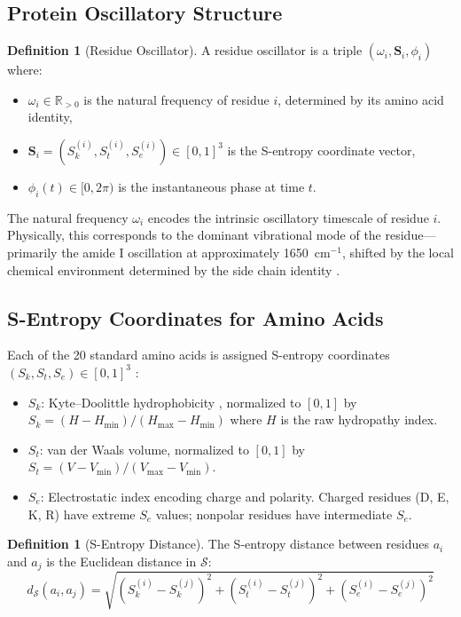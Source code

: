 \documentclass[11pt,twocolumn,a4paper]{article}
\theoremstyle{definition}
\newtheorem{definition}[theorem]{Definition}
\theoremstyle{remark}
\newcommand{\Sk}{S_k}
\newcommand{\St}{S_t}
\newcommand{\Se}{S_e}
\newcommand{\Sspace}{\mathcal{S}}
\newcommand{\Scoord}{\mathbf{S}}
\newcommand{\R}{\mathbb{R}}
\newcommand{\natfreq}{\omega}
\begin{document}
\subsection{Protein Oscillatory Structure}

\begin{definition}[Residue Oscillator]
\label{def:residue_oscillator}
A residue oscillator is a triple $(\natfreq_i, \Scoord_i, \phi_i)$ where:
\begin{itemize}
    \item $\natfreq_i \in \R_{>0}$ is the natural frequency of residue $i$, determined by its amino acid identity,
    \item $\Scoord_i = (\Sk^{(i)}, \St^{(i)}, \Se^{(i)}) \in [0,1]^3$ is the S-entropy coordinate vector,
    \item $\phi_i(t) \in [0, 2\pi)$ is the instantaneous phase at time $t$.
\end{itemize}
\end{definition}

The natural frequency $\natfreq_i$ encodes the intrinsic oscillatory timescale of residue $i$. Physically, this corresponds to the dominant vibrational mode of the residue---primarily the amide I oscillation at approximately 1650~cm$^{-1}$, shifted by the local chemical environment determined by the side chain identity \citep{barth2007, krimm1986}.

\subsection{S-Entropy Coordinates for Amino Acids}
\label{sec:s_entropy}

Each of the 20 standard amino acids is assigned S-entropy coordinates $(\Sk, \St, \Se) \in [0,1]^3$ \citep{sachikonye2025c}:
\begin{itemize}
    \item $\Sk$: Kyte--Doolittle hydrophobicity \citep{kyte1982}, normalized to $[0,1]$ by $\Sk = (H - H_{\min}) / (H_{\max} - H_{\min})$ where $H$ is the raw hydropathy index.
    \item $\St$: van der Waals volume, normalized to $[0,1]$ by $\St = (V - V_{\min}) / (V_{\max} - V_{\min})$.
    \item $\Se$: Electrostatic index encoding charge and polarity. Charged residues (D, E, K, R) have extreme $\Se$ values; nonpolar residues have intermediate $\Se$.
\end{itemize}

\begin{definition}[S-Entropy Distance]
\label{def:s_distance}
The S-entropy distance between residues $a_i$ and $a_j$ is the Euclidean distance in $\Sspace$:
\begin{equation}
d_{\Sspace}(a_i, a_j) = \sqrt{(\Sk^{(i)} - \Sk^{(j)})^2 + (\St^{(i)} - \St^{(j)})^2 + (\Se^{(i)} - \Se^{(j)})^2}
\end{equation}
\end{definition}
\end{document}
